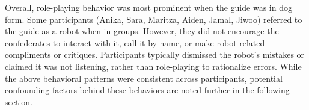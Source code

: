 Overall, role-playing behavior was most prominent when the guide was in dog form. Some participants (Anika, Sara, Maritza, Aiden, Jamal, Jiwoo) referred to the guide as a robot when in groups. However, they did not encourage the confederates to interact with it, call it by name, or make robot-related compliments or critiques. Participants typically dismissed the robot’s mistakes or claimed it was not listening, rather than role-playing to rationalize errors. While the above behavioral patterns were consistent across participants, potential confounding factors behind these behaviors are noted further in the following section.